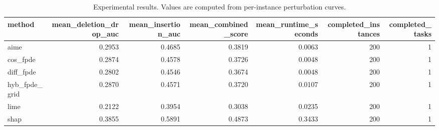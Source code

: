 \begin{table}[t]
\caption{Experimental results. Values are computed from per-instance perturbation curves.}
\label{tab:main_results_computed}
\centering
\begin{tabular}{lrrrrrr}
\toprule
method & mean\_deletion\_drop\_auc & mean\_insertion\_auc & mean\_combined\_score & mean\_runtime\_seconds & completed\_instances & completed\_tasks \\
\midrule
aime & 0.2953 & 0.4685 & 0.3819 & 0.0063 & 200 & 1 \\
cos\_fpde & 0.2874 & 0.4578 & 0.3726 & 0.0048 & 200 & 1 \\
diff\_fpde & 0.2802 & 0.4546 & 0.3674 & 0.0048 & 200 & 1 \\
hyb\_fpde\_grid & 0.2870 & 0.4571 & 0.3720 & 0.0107 & 200 & 1 \\
lime & 0.2122 & 0.3954 & 0.3038 & 0.0235 & 200 & 1 \\
shap & 0.3855 & 0.5891 & 0.4873 & 0.3433 & 200 & 1 \\
\bottomrule
\end{tabular}

\end{table}
